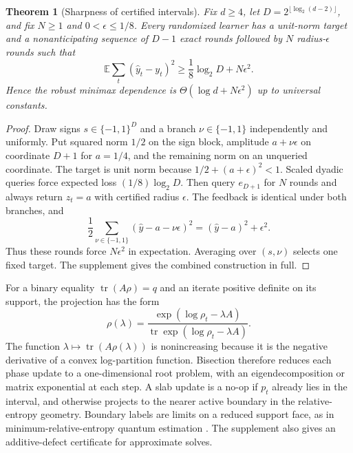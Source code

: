 \documentclass[twoside]{article}
\newtheorem{theorem}{Theorem}
\newcommand{\tr}{\operatorname{tr}}
\begin{document}
\begin{theorem}[Sharpness of certified intervals]
\label{thm:robust-lower}
Fix $d\geq4$, let $D=2^{\lfloor\log_2(d-2)\rfloor}$, and fix $N\geq1$ and $0<\epsilon\leq1/8$. Every randomized learner has a unit-norm target and a nonanticipating sequence of $D-1$ exact rounds followed by $N$ radius-$\epsilon$ rounds such that
\begin{equation}
\mathbb E\sum_t(\widehat y_t-y_t)^2\geq\frac18\log_2D+N\epsilon^2.
\label{eq:robust-lower}
\end{equation}
Hence the robust minimax dependence is $\Theta(\log d+N\epsilon^2)$ up to universal constants.
\end{theorem}

\begin{proof}
Draw signs $s\in\{-1,1\}^D$ and a branch $\nu\in\{-1,1\}$ independently and uniformly. Put squared norm $1/2$ on the sign block, amplitude $a+\nu\epsilon$ on coordinate $D+1$ for $a=1/4$, and the remaining norm on an unqueried coordinate. The target is unit norm because $1/2+(a+\epsilon)^2<1$. Scaled dyadic queries force expected loss $(1/8)\log_2D$. Then query $e_{D+1}$ for $N$ rounds and always return $z_t=a$ with certified radius $\epsilon$. The feedback is identical under both branches, and
\begin{equation}
\frac12\sum_{\nu\in\{-1,1\}}(\widehat y-a-\nu\epsilon)^2=(\widehat y-a)^2+\epsilon^2.
\end{equation}
Thus these rounds force $N\epsilon^2$ in expectation. Averaging over $(s,\nu)$ selects one fixed target. The supplement gives the combined construction in full.
\end{proof}

For a binary equality $\tr(A\rho)=q$ and an iterate positive definite on its support, the projection has the form
\begin{equation}
\rho(\lambda)=\frac{\exp(\log\rho_t-\lambda A)}{\tr\exp(\log\rho_t-\lambda A)}.
\label{eq:exponential-form}
\end{equation}
The function $\lambda\mapsto\tr(A\rho(\lambda))$ is nonincreasing because it is the negative derivative of a convex log-partition function. Bisection therefore reduces each phase update to a one-dimensional root problem, with an eigendecomposition or matrix exponential at each step. A slab update is a no-op if $p_t$ already lies in the interval, and otherwise projects to the nearer active boundary in the relative-entropy geometry. Boundary labels are limits on a reduced support face, as in minimum-relative-entropy quantum estimation \citep{zorzi2014minimum}. The supplement also gives an additive-defect certificate for approximate solves.
\end{document}
